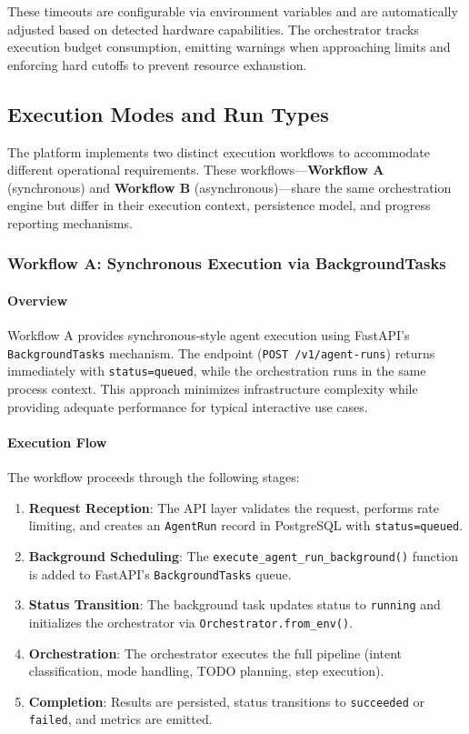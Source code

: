 These timeouts are configurable via environment variables and are automatically adjusted based on detected hardware capabilities. The orchestrator tracks execution budget consumption, emitting warnings when approaching limits and enforcing hard cutoffs to prevent resource exhaustion.

\subsection{Execution Modes and Run Types}
\label{subsec:execution-modes}

The platform implements two distinct execution workflows to accommodate different operational requirements. These workflows---\textbf{Workflow A} (synchronous) and \textbf{Workflow B} (asynchronous)---share the same orchestration engine but differ in their execution context, persistence model, and progress reporting mechanisms.

\subsubsection{Workflow A: Synchronous Execution via BackgroundTasks}
\label{subsubsec:workflow-a}

\paragraph{Overview} Workflow A provides synchronous-style agent execution using FastAPI's \texttt{BackgroundTasks} mechanism. The endpoint (\texttt{POST /v1/agent-runs}) returns immediately with \texttt{status=queued}, while the orchestration runs in the same process context. This approach minimizes infrastructure complexity while providing adequate performance for typical interactive use cases.

\paragraph{Execution Flow} The workflow proceeds through the following stages:
\begin{enumerate}
    \item \textbf{Request Reception}: The API layer validates the request, performs rate limiting, and creates an \texttt{AgentRun} record in PostgreSQL with \texttt{status=queued}.
    \item \textbf{Background Scheduling}: The \texttt{execute\_agent\_run\_background()} function is added to FastAPI's \texttt{BackgroundTasks} queue.
    \item \textbf{Status Transition}: The background task updates status to \texttt{running} and initializes the orchestrator via \texttt{Orchestrator.from\_env()}.
    \item \textbf{Orchestration}: The orchestrator executes the full pipeline (intent classification, mode handling, TODO planning, step execution).
    \item \textbf{Completion}: Results are persisted, status transitions to \texttt{succeeded} or \texttt{failed}, and metrics are emitted.
\end{enumerate}

